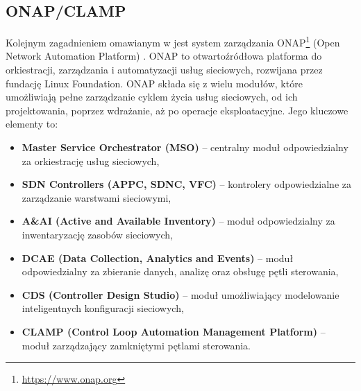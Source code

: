 \subsection{ONAP/CLAMP}

Kolejnym zagadnieniem omawianym w \cite{fallon2019} jest system zarządzania ONAP\footnote{\url{https://www.onap.org}} (Open Network Automation Platform) \cite{onap2018}. ONAP to otwartoźródłowa platforma do orkiestracji, zarządzania i automatyzacji usług sieciowych, rozwijana przez fundację Linux Foundation. ONAP składa się z wielu modułów, które umożliwiają pełne zarządzanie cyklem życia usług sieciowych, od ich projektowania, poprzez wdrażanie, aż po operacje eksploatacyjne. Jego kluczowe elementy to:
\begin{itemize}
    \item \textbf{Master Service Orchestrator (MSO)} – centralny moduł odpowiedzialny za orkiestrację usług sieciowych,
    \item \textbf{SDN Controllers (APPC, SDNC, VFC)} –  kontrolery odpowiedzialne za zarządzanie warstwami sieciowymi,
    \item \textbf{A\&AI (Active and Available Inventory)} – moduł odpowiedzialny za inwentaryzację zasobów sieciowych,
    \item \textbf{DCAE (Data Collection, Analytics and Events)} – moduł odpowiedzialny za zbieranie danych, analizę oraz obsługę pętli sterowania,
    \item \textbf{CDS (Controller Design Studio)} – moduł umożliwiający modelowanie inteligentnych konfiguracji sieciowych,
    \item \textbf{CLAMP (Control Loop Automation Management Platform)} – moduł zarządzający zamkniętymi pętlami sterowania.
\end{itemize}

